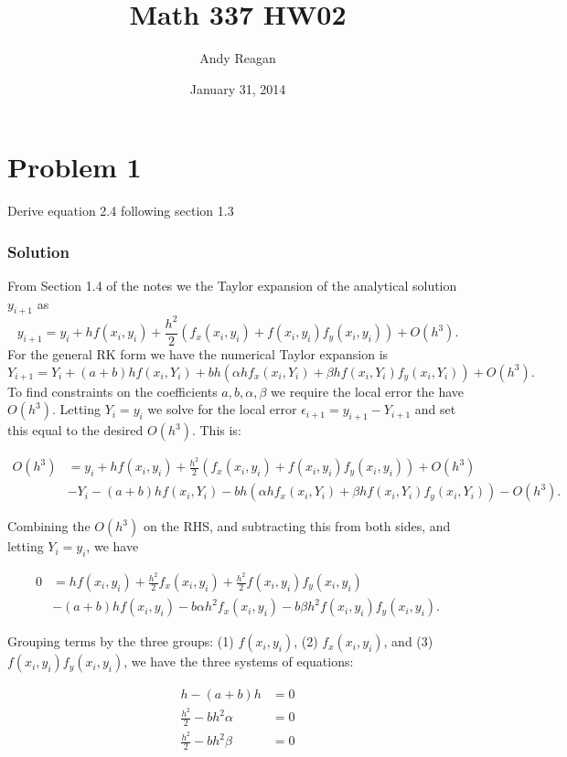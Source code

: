\documentclass[letterpaper,10pt,english]{/Library/Python/2.7/site-packages/Sphinx-1.2-py2.7.egg/sphinx/texinputs/sphinxhowto}
\title{Math 337 HW02}
\date{January 31, 2014}
\author{Andy Reagan}
\begin{document}
        
            \maketitle
        

        


        
        \section{Problem 1}Derive equation 2.4 following section 1.3\subsubsection*{Solution}From Section 1.4 of the notes we the Taylor expansion of the analytical
solution $y_{i+1}$ as
\[ y_{i+1} = y_i + hf(x_i,y_i) + \frac{h^2}{2} \left ( f_x (x_i,y_i) + f(x_i,y_i)f_y(x_i,y_i) \right ) + O(h^3) .\]
For the general RK form we have the numerical Taylor expansion is
\[ Y_{i+1} = Y_i + (a+b)hf(x_i,Y_i) + bh \left ( \alpha h f_x (x_i,Y_i) + \beta h f(x_i, Y_i) f_y(x_i,Y_i) \right ) + O(h^3) .\]
To find constraints on the coefficients $a,b,\alpha,\beta$ we require
the local error the have $O(h^3)$. Letting $Y_i = y_i$ we solve for the
local error $\epsilon _{i+1} = y_{i+1} - Y_{i+1}$ and set this equal to
the desired $O(h^3)$. This is:

\begin{align*} O(h^3) &= y_i + hf(x_i,y_i) + \frac{h^2}{2} \left ( f_x (x_i,y_i) + f(x_i,y_i)f_y(x_i,y_i) \right ) + O(h^3)\\
&- Y_i - (a+b)hf(x_i,Y_i) - bh \left ( \alpha h f_x (x_i,Y_i) + \beta h f(x_i, Y_i) f_y(x_i,Y_i) \right ) - O(h^3) .\end{align*}

Combining the $O(h^3)$ on the RHS, and subtracting this from both sides,
and letting $Y_i = y_i$, we have

\begin{align*} 0 &= hf(x_i,y_i) + \frac{h^2}{2} f_x (x_i,y_i) + \frac{h^2}{2}f(x_i,y_i)f_y(x_i,y_i) \\
&- (a+b)hf(x_i,y_i) - b  \alpha h^2  f_x (x_i,y_i) - b \beta h^2 f(x_i, y_i) f_y(x_i,y_i).\end{align*}

Grouping terms by the three groups: (1) $f(x_i,y_i)$, (2)
$f_x (x_i,y_i)$, and (3) $f(x_i,y_i) f_y (x_i, y_i)$, we have the three
systems of equations:

\begin{align*} h - (a+b) h &= 0\\
\frac{h^2}{2} - b h^2 \alpha &= 0\\
\frac{h^2}{2} - b h^2 \beta &= 0\end{align*}
\end{document}
